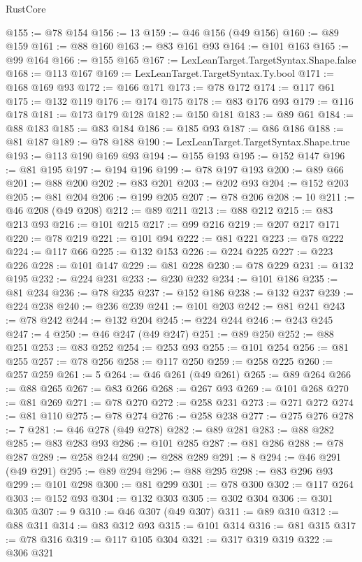 \begin{lexlean}{RustCore}
\begin{coremodule}
@155 := @78 @154
@156 := 13
@159 := @46 @156 (@49 @156)
@160 := @89 @159
@161 := @88 @160
@163 := @83 @161 @93
@164 := @101 @163
@165 := @99 @164
@166 := @155 @165
@167 := LexLeanTarget.TargetSyntax.Shape.false
@168 := @113 @167
@169 := LexLeanTarget.TargetSyntax.Ty.bool
@171 := @168 @169 @93
@172 := @166 @171
@173 := @78 @172
@174 := @117 @61
@175 := @132 @119
@176 := @174 @175
@178 := @83 @176 @93
@179 := @116 @178
@181 := @173 @179 @128
@182 := @150 @181
@183 := @89 @61
@184 := @88 @183
@185 := @83 @184
@186 := @185 @93
@187 := @86 @186
@188 := @81 @187
@189 := @78 @188
@190 := LexLeanTarget.TargetSyntax.Shape.true
@193 := @113 @190 @169 @93
@194 := @155 @193
@195 := @152 @147
@196 := @81 @195
@197 := @194 @196
@199 := @78 @197 @193
@200 := @89 @66
@201 := @88 @200
@202 := @83 @201
@203 := @202 @93
@204 := @152 @203
@205 := @81 @204
@206 := @199 @205
@207 := @78 @206
@208 := 10
@211 := @46 @208 (@49 @208)
@212 := @89 @211
@213 := @88 @212
@215 := @83 @213 @93
@216 := @101 @215
@217 := @99 @216
@219 := @207 @217 @171
@220 := @78 @219
@221 := @101 @94
@222 := @81 @221
@223 := @78 @222
@224 := @117 @66
@225 := @132 @153
@226 := @224 @225
@227 := @223 @226
@228 := @101 @147
@229 := @81 @228
@230 := @78 @229
@231 := @132 @195
@232 := @224 @231
@233 := @230 @232
@234 := @101 @186
@235 := @81 @234
@236 := @78 @235
@237 := @152 @186
@238 := @132 @237
@239 := @224 @238
@240 := @236 @239
@241 := @101 @203
@242 := @81 @241
@243 := @78 @242
@244 := @132 @204
@245 := @224 @244
@246 := @243 @245
@247 := 4
@250 := @46 @247 (@49 @247)
@251 := @89 @250
@252 := @88 @251
@253 := @83 @252
@254 := @253 @93
@255 := @101 @254
@256 := @81 @255
@257 := @78 @256
@258 := @117 @250
@259 := @258 @225
@260 := @257 @259
@261 := 5
@264 := @46 @261 (@49 @261)
@265 := @89 @264
@266 := @88 @265
@267 := @83 @266
@268 := @267 @93
@269 := @101 @268
@270 := @81 @269
@271 := @78 @270
@272 := @258 @231
@273 := @271 @272
@274 := @81 @110
@275 := @78 @274
@276 := @258 @238
@277 := @275 @276
@278 := 7
@281 := @46 @278 (@49 @278)
@282 := @89 @281
@283 := @88 @282
@285 := @83 @283 @93
@286 := @101 @285
@287 := @81 @286
@288 := @78 @287
@289 := @258 @244
@290 := @288 @289
@291 := 8
@294 := @46 @291 (@49 @291)
@295 := @89 @294
@296 := @88 @295
@298 := @83 @296 @93
@299 := @101 @298
@300 := @81 @299
@301 := @78 @300
@302 := @117 @264
@303 := @152 @93
@304 := @132 @303
@305 := @302 @304
@306 := @301 @305
@307 := 9
@310 := @46 @307 (@49 @307)
@311 := @89 @310
@312 := @88 @311
@314 := @83 @312 @93
@315 := @101 @314
@316 := @81 @315
@317 := @78 @316
@319 := @117 @105 @304
@321 := @317 @319 @319
@322 := @306 @321

\end{coremodule}
\end{lexlean}
